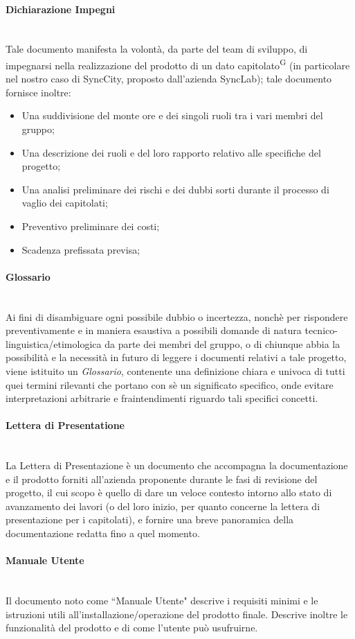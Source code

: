 \documentclass[8pt]{article}
\newcommand{\glossterm}[1]{#1\textsuperscript{G}} %
\newcommand{\subsubsubsection}[1]{\paragraph{#1}\mbox{}\\}
\begin{document}
\subsubsubsection{Dichiarazione Impegni}
Tale documento manifesta la volontà, da parte del team di sviluppo, di impegnarsi nella realizzazione del prodotto di un dato \glossterm{capitolato} (in particolare nel nostro caso di SyncCity, proposto dall'azienda SyncLab); tale documento fornisce inoltre:
\begin{itemize}
    \item Una suddivisione del monte ore e dei singoli ruoli tra i vari membri del gruppo;
    \item Una descrizione dei ruoli e del loro rapporto relativo alle specifiche del progetto;
    \item Una analisi preliminare dei rischi e dei dubbi sorti durante il processo di vaglio dei capitolati;
    \item Preventivo preliminare dei costi;
    \item Scadenza prefissata previsa;
\end{itemize}

\subsubsubsection{Glossario}
Ai fini di disambiguare ogni possibile dubbio o incertezza, nonchè per rispondere preventivamente e
in maniera esaustiva a possibili domande di natura tecnico-linguistica/etimologica da parte dei
membri del gruppo, o di chiunque abbia la possibilità e la necessità in futuro di leggere i
documenti relativi a tale progetto, viene istituito un \textit{Glossario}, contenente una definizione chiara e univoca di tutti quei termini rilevanti che portano con sè un significato specifico, onde evitare interpretazioni arbitrarie e fraintendimenti riguardo tali specifici concetti.

\subsubsubsection{Lettera di Presentatione}
La Lettera di Presentazione è un documento che accompagna la documentazione e il prodotto forniti all'azienda proponente durante le fasi di revisione del progetto, il cui scopo è quello di dare un veloce contesto intorno allo stato di avanzamento dei lavori (o del loro inizio, per quanto concerne la lettera di presentazione per i capitolati), e fornire una breve panoramica della documentazione redatta fino a quel momento. 

\subsubsubsection{Manuale Utente}
Il documento noto come ``Manuale Utente" descrive i requisiti minimi e le istruzioni utili all'installazione/operazione del prodotto finale. Descrive inoltre le funzionalità del prodotto e di come l'utente può usufruirne.
\end{document}
